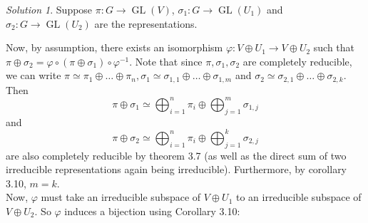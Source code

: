 \documentclass[reqno]{amsart}
\theoremstyle{definition}
\theoremstyle{remark}
\newtheorem*{solution}{Solution}
\DeclareMathOperator{\GL}{GL}
\begin{document}
    \begin{solution}

        Suppose
        $\pi \colon G \to 
        \GL(V)$,
        $\sigma_1 \colon G \to \GL(U_1)$ and
        $\sigma_2 \colon G \to \GL(U_2)$ are
        the representations.
    
        Now, by assumption, there exists
        an isomorphism
        $\varphi \colon
        V \oplus U_1 \to 
        V \oplus U_2$ such that
        $\pi \oplus \sigma_2 =
        \varphi \circ (\pi \oplus \sigma_1) \circ
        \varphi^{-1}$.
        Note that
        since $\pi, \sigma_1, \sigma_2$ are completely
        reducible, we can write
        $\pi \simeq \pi_1 \oplus \ldots \oplus \pi_n,
        \sigma_1 \simeq \sigma_{1,1} \oplus \ldots
        \oplus \sigma_{1,m}$ and
        $\sigma_2 \simeq \sigma_{2,1} \oplus \ldots
        \oplus \sigma_{2,k}$. Then
         \[
        \pi \oplus \sigma_1
        \simeq \bigoplus_{i=1}^{n} \pi_i
        \oplus \bigoplus_{j=1}^{m} \sigma_{1,j}
        \] 
        and
         \[
        \pi \oplus \sigma_2
        \simeq \bigoplus_{i=1}^{n} \pi_i
        \oplus \bigoplus_{j=1}^{k} \sigma_{2,j}
        \] 
        are also completely reducible by theorem 3.7 (as
        well as the direct sum of two irreducible representations
        again being irreducible). Furthermore, by
        corollary 3.10, $m = k$.\\

        Now, $\varphi $ must take an irreducible
        subspace of
        $V \oplus U_1$ to an irreducible subspace of
        $V \oplus U_2$.
        So $\varphi $ induces a bijection 
        using Corollary 3.10:


\end{solution}
\end{document}
